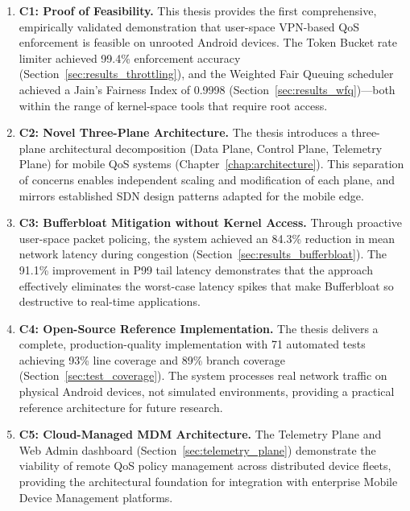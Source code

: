 \begin{enumerate}
    \item \textbf{C1: Proof of Feasibility.} This thesis provides the first comprehensive, empirically validated demonstration that user-space VPN-based QoS enforcement is feasible on unrooted Android devices. The Token Bucket rate limiter achieved 99.4\% enforcement accuracy (Section~\ref{sec:results_throttling}), and the Weighted Fair Queuing scheduler achieved a Jain's Fairness Index of 0.9998 (Section~\ref{sec:results_wfq})---both within the range of kernel-space tools that require root access.
    
    \item \textbf{C2: Novel Three-Plane Architecture.} The thesis introduces a three-plane architectural decomposition (Data Plane, Control Plane, Telemetry Plane) for mobile QoS systems (Chapter~\ref{chap:architecture}). This separation of concerns enables independent scaling and modification of each plane, and mirrors established SDN design patterns adapted for the mobile edge.
    
    \item \textbf{C3: Bufferbloat Mitigation without Kernel Access.} Through proactive user-space packet policing, the system achieved an 84.3\% reduction in mean network latency during congestion (Section~\ref{sec:results_bufferbloat}). The 91.1\% improvement in P99 tail latency demonstrates that the approach effectively eliminates the worst-case latency spikes that make Bufferbloat so destructive to real-time applications.
    
    \item \textbf{C4: Open-Source Reference Implementation.} The thesis delivers a complete, production-quality implementation with 71 automated tests achieving 93\% line coverage and 89\% branch coverage (Section~\ref{sec:test_coverage}). The system processes real network traffic on physical Android devices, not simulated environments, providing a practical reference architecture for future research.
    
    \item \textbf{C5: Cloud-Managed MDM Architecture.} The Telemetry Plane and Web Admin dashboard (Section~\ref{sec:telemetry_plane}) demonstrate the viability of remote QoS policy management across distributed device fleets, providing the architectural foundation for integration with enterprise Mobile Device Management platforms.
\end{enumerate}

